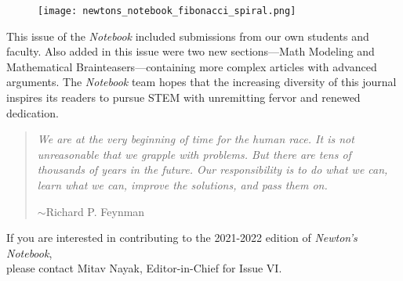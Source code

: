 \documentclass[12pt]{article}
\theoremstyle{definition}
\begin{document}
\newpage



\newpage


\begin{figure}[H]
    \centering
    \vspace*{50pt}
    \texttt{[image: newtons\_notebook\_fibonacci\_spiral.png]}
    \vspace*{25pt}
\end{figure}

    This issue of the \textit{Notebook} included submissions from our own students and faculty. Also added in this issue were two new sections—Math Modeling and Mathematical Brainteasers—containing more complex articles with advanced arguments. The \textit{Notebook} team hopes that the increasing diversity of this journal inspires its readers to pursue STEM with unremitting fervor and renewed dedication. 

\begin{quotation}
\textit{We are at the very beginning of time for the human race. It is not unreasonable that we grapple with problems. But there are tens of thousands of years in the future. Our responsibility is to do what we can, learn what we can, improve the solutions, and pass them on.}
	\begin{flushright}
$\sim$Richard P. Feynman
	\end{flushright}
\end{quotation}

\begin{center}
If you are interested in contributing to the 2021-2022 edition of \textit{Newton’s Notebook},\\ 
please contact Mitav Nayak, Editor-in-Chief for Issue VI.
\end{center}

\end{document}
